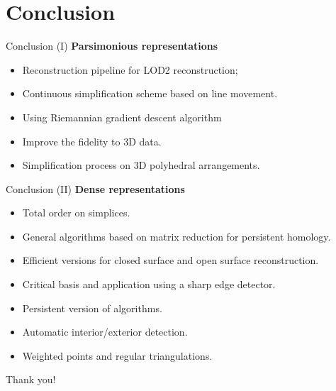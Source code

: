 \section{Conclusion}
\begin{frame}{Conclusion (I)}
\scriptsize
\textbf{Parsimonious representations}
\begin{itemize}
	\item<+-> Reconstruction pipeline for LOD2 reconstruction;
	\item<+-> Continuous simplification scheme based on line movement.
	\item<+-> Using Riemannian gradient descent algorithm
\end{itemize}
	
\begin{itemize}
	\item<+-> Improve the fidelity to 3D data.
	\item<+-> Simplification process on 3D polyhedral arrangements.
\end{itemize}
\end{frame}

\begin{frame}{Conclusion (II)}
\scriptsize
\textbf{Dense representations}
\begin{itemize}
	\item<+-> Total order on simplices.
	\item<+-> General algorithms based on matrix reduction for persistent homology.
	\item<+-> Efficient versions for closed surface and open surface reconstruction.
	\item<+-> Critical basis and application using a sharp edge detector.
\end{itemize}

\begin{itemize}
	\item<+-> Persistent version of algorithms.
	\item<+-> Automatic interior/exterior detection.
	\item<+-> Weighted points and regular triangulations.
\end{itemize}

\end{frame}

\begin{frame}[standout]
	Thank you!
\end{frame}
